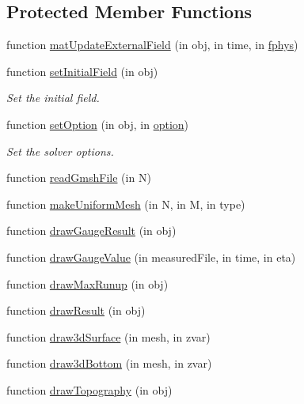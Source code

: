 \subsection*{Protected Member Functions}
\begin{DoxyCompactItemize}
\item 
function \hyperlink{class_conical_land_runup2d_ad1c9fb7c603283b5ce36ec2b5c360137}{mat\+Update\+External\+Field} (in obj, in time, in \hyperlink{class_ndg_phys_a6b25724fc9474d32018439009072f0a9}{fphys})
\item 
function \hyperlink{class_conical_land_runup2d_a04372a7587fb4e32f78635aa9bb90c57}{set\+Initial\+Field} (in obj)
\begin{DoxyCompactList}\small\item\em Set the initial field. \end{DoxyCompactList}\item 
function \hyperlink{class_conical_land_runup2d_ae0d43977d1475d69da1aacf44fbfcbee}{set\+Option} (in obj, in \hyperlink{class_ndg_phys_af91f4c54b93504e76b38a5693774dff1}{option})
\begin{DoxyCompactList}\small\item\em Set the solver options. \end{DoxyCompactList}\item 
function \hyperlink{class_conical_land_runup2d_a65b4e544772a1a10c79e29ef3436a7be}{read\+Gmsh\+File} (in N)
\item 
function \hyperlink{class_conical_land_runup2d_a7745592d6b020ffa5712c4714b6a0656}{make\+Uniform\+Mesh} (in N, in M, in type)
\item 
function \hyperlink{class_conical_land_runup2d_ae118e044fe5ca9e0b4a25cb6102d8bed}{draw\+Gauge\+Result} (in obj)
\item 
function \hyperlink{class_conical_land_runup2d_a1eee496f7d68b77f78582aee7e1b7610}{draw\+Gauge\+Value} (in measured\+File, in time, in eta)
\item 
function \hyperlink{class_conical_land_runup2d_aee7b9d4f41ae001390d9cbeddbff90fc}{draw\+Max\+Runup} (in obj)
\item 
function \hyperlink{class_conical_land_runup2d_a8aff1a9ba1960d0790ba6f88aa2d2385}{draw\+Result} (in obj)
\item 
function \hyperlink{class_conical_land_runup2d_aceec626e977197f8ad368fe0a442833d}{draw3d\+Surface} (in mesh, in zvar)
\item 
function \hyperlink{class_conical_land_runup2d_a3da5d3adf6ca3d0333bad6852d665551}{draw3d\+Bottom} (in mesh, in zvar)
\item 
function \hyperlink{class_conical_land_runup2d_a5660e92813ca38f579f178fc6b4750c1}{draw\+Topography} (in obj)
\end{DoxyCompactItemize}
